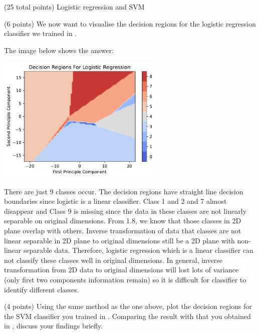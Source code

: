 \documentclass[12pt]{article}
\begin{document}
\begin{question}{(25 total points) Logistic regression and SVM}
\begin{subquestion}{(6 points)
       We now want to visualise the decision regions for the logistic
       regression classifier we trained in .
     }
      \begin{answerbox}{35em}
         The image below shows the answer:
         \begin{center}
         \includegraphics[width=0.6\textwidth]{DR1.pdf}
         \end{center}
         There are just 9 classes occur. The decision regions have straight line decision boundaries since logistic is a linear classifier. Class 1 and 2 and 7 almost disappear and Class 9 is missing since the data in these classes are not linearly separable on original dimensions. From 1.8, we know that those classes in 2D plane overlap with others. Inverse transformation of data that classes are not linear separable in 2D plane to original dimensions still be a 2D plane with non-linear separable data. Therefore, logistic regression which is a linear classifier can not classify these classes well in original dimensions. In general, inverse transformation from 2D data to original dimensions will lost lots of variance (only first two components information remain) so it is difficult for classifier to identify different classes.
      \end{answerbox}
  


   \end{subquestion}
   \begin{subquestion}{(4 points)
       Using the same method as the one above, plot the decision regions for
       the SVM classifier you trained in .
       Comparing the result with that you obtained in , discuss your
       findings briefly.
     } \label{Q2.4}
   


\end{subquestion}
\end{question}
\end{document}
